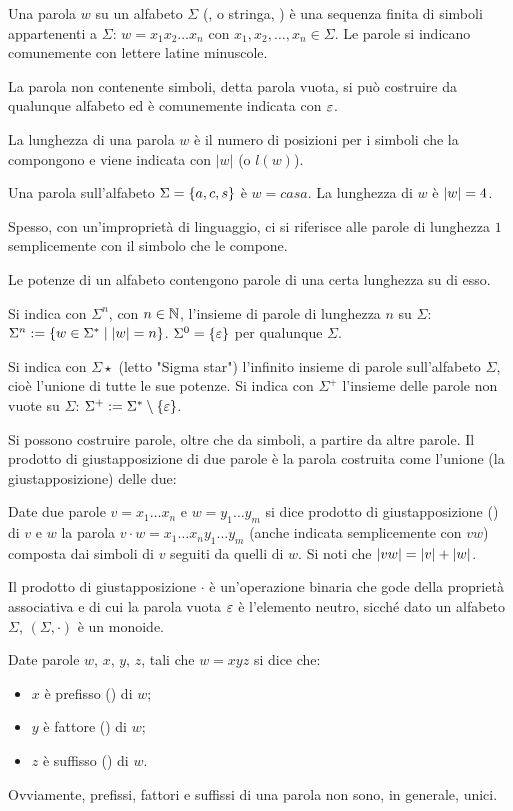 \begin{defin}[parola]
	Una parola $w$ su un alfabeto $\Sigma$ (, o stringa, ) è una sequenza finita di simboli appartenenti a $\Sigma$: $w=x_1 x_2 \dots x_n$ con $x_1,x_2,\dots,x_n\in\Sigma$. Le parole si indicano comunemente con lettere latine minuscole.

	La parola non contenente simboli, detta parola vuota, si può costruire da qualunque alfabeto ed è comunemente indicata con $\varepsilon$.

	La lunghezza di una parola $w$ è il numero di posizioni per i simboli che la compongono e viene indicata con $|w|$ (o $l(w)$).
\end{defin}
\begin{examp}
	Una parola sull'alfabeto $\Sigma=\left\{ a,c,s \right\}$ è $w=casa$. La lunghezza di $w$ è $|w|=4$.
\end{examp}
Spesso, con un'improprietà di linguaggio, ci si riferisce alle parole di lunghezza $1$ semplicemente con il simbolo che le compone.

Le potenze di un alfabeto contengono parole di una certa lunghezza su di esso.
\begin{defin}
	Si indica con $\Sigma^n$, con $n\in\mathbb N$, l'insieme di parole di lunghezza $n$ su $\Sigma$: $\Sigma^n := \left\{ w\in\Sigma^*\mid |w|=n \right\}$. $\Sigma^0=\left\{ \varepsilon \right\}$ per qualunque $\Sigma$.

	Si indica con $\Sigma\star$ (letto "Sigma star") l'infinito insieme di parole sull'alfabeto $\Sigma$, cioè l'unione di tutte le sue potenze. Si indica con $\Sigma^+$ l'insieme delle parole non vuote su $\Sigma$: $\Sigma^+ := \Sigma^*\setminus\left\{ \varepsilon \right\}$.
\end{defin}

Si possono costruire parole, oltre che da simboli, a partire da altre parole. Il prodotto di giustapposizione di due parole è la parola costruita come l'unione (la giustapposizione) delle due:
\begin{defin}
	Date due parole $v=x_1\dots x_n$ e $w=y_1\dots y_m$ si dice prodotto di giustapposizione () di $v$ e $w$ la parola $v\cdot w=x_1\dots x_n y_1\dots y_m$ (anche indicata semplicemente con $vw$) composta dai simboli di $v$ seguiti da quelli di $w$. Si noti che $|vw|=|v|+|w|$.
\end{defin}
Il prodotto di giustapposizione $\cdot$ è un'operazione binaria che gode della proprietà associativa e di cui la parola vuota $\varepsilon$ è l'elemento neutro, sicché dato un alfabeto $\Sigma$, $(\Sigma,\cdot)$ è un monoide.
\begin{defin}
	Date parole $w$, $x$, $y$, $z$, tali che $w=xyz$ si dice che:
	\begin{itemize}
		\item $x$ è prefisso () di $w$;
		\item $y$ è fattore () di $w$;
		\item $z$ è suffisso () di $w$.
	\end{itemize}
\end{defin}
Ovviamente, prefissi, fattori e suffissi di una parola non sono, in generale, unici.



